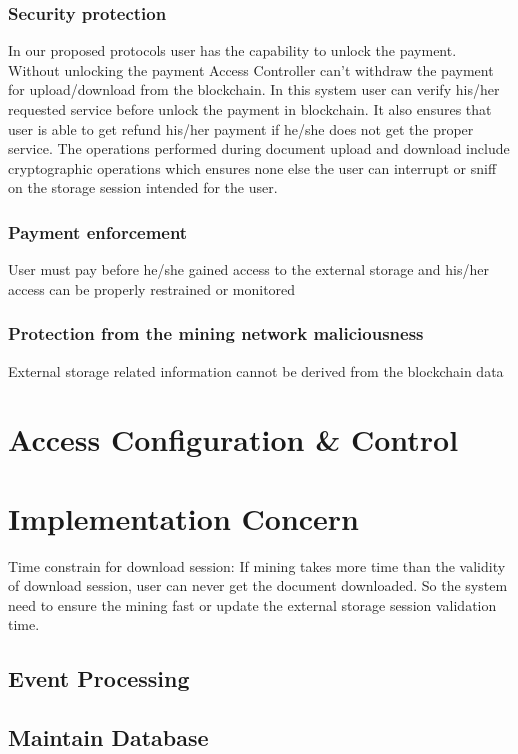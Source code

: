 \documentclass[letterpaper, 10 pt, conference]{ieeeconf}  %
\begin{document}
\subsubsection{Security protection}
In our proposed protocols user has the capability to unlock the payment. Without unlocking the payment Access Controller can't withdraw the payment for upload/download from the blockchain. In this system user can verify his/her requested service before unlock the payment in blockchain. It also ensures that user is able to get refund his/her payment if he/she does not get the proper service.
The operations performed during document upload and download include cryptographic operations which ensures none else the user can interrupt or sniff on the storage session intended for the user.

\subsubsection{Payment enforcement}
User must pay before he/she gained access to the external storage and his/her access can be properly restrained or monitored

\subsubsection{Protection from the mining network maliciousness} 
External storage related information cannot be derived from the blockchain data



\section{Access Configuration \& Control}

\section{Implementation Concern}

Time constrain for download session: If mining takes more time than the validity of download session, user can never get the document downloaded. So the system need to ensure the mining fast or update the external storage session validation time.

\subsection{Event Processing}

\subsection{Maintain Database}
\end{document}
